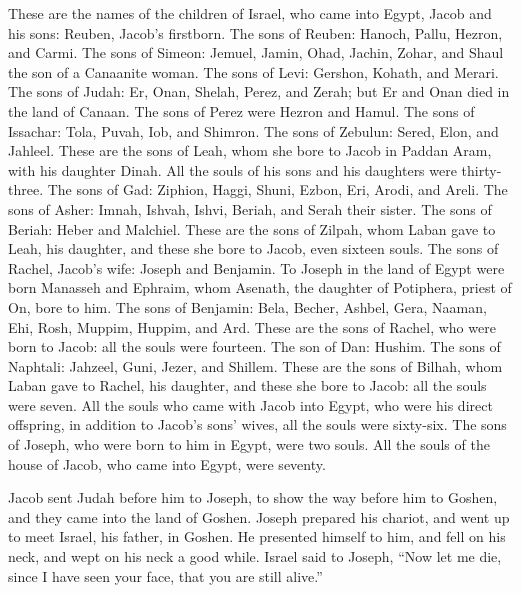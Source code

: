 These are the names of the children of Israel, who came
into Egypt, Jacob and his sons: Reuben, Jacob's firstborn.
 The sons of Reuben: Hanoch, Pallu, Hezron, and Carmi.
 The sons of Simeon: Jemuel, Jamin, Ohad, Jachin, Zohar,
and Shaul the son of a Canaanite woman.  The sons of
Levi: Gershon, Kohath, and Merari.  The sons of Judah:
Er, Onan, Shelah, Perez, and Zerah; but Er and Onan died in the land of
Canaan. The sons of Perez were Hezron and Hamul.  The
sons of Issachar: Tola, Puvah, Iob, and Shimron.  The
sons of Zebulun: Sered, Elon, and Jahleel.  These are the
sons of Leah, whom she bore to Jacob in Paddan Aram, with his daughter
Dinah. All the souls of his sons and his daughters were thirty-three.
 The sons of Gad: Ziphion, Haggi, Shuni, Ezbon, Eri,
Arodi, and Areli.  The sons of Asher: Imnah, Ishvah,
Ishvi, Beriah, and Serah their sister. The sons of Beriah: Heber and
Malchiel.  These are the sons of Zilpah, whom Laban gave
to Leah, his daughter, and these she bore to Jacob, even sixteen souls.
 The sons of Rachel, Jacob's wife: Joseph and Benjamin.
 To Joseph in the land of Egypt were born Manasseh and
Ephraim, whom Asenath, the daughter of Potiphera, priest of On, bore to
him.  The sons of Benjamin: Bela, Becher, Ashbel, Gera,
Naaman, Ehi, Rosh, Muppim, Huppim, and Ard.  These are
the sons of Rachel, who were born to Jacob: all the souls were fourteen.
 The son of Dan: Hushim.  The sons of
Naphtali: Jahzeel, Guni, Jezer, and Shillem.  These are
the sons of Bilhah, whom Laban gave to Rachel, his daughter, and these
she bore to Jacob: all the souls were seven.  All the
souls who came with Jacob into Egypt, who were his direct offspring, in
addition to Jacob's sons' wives, all the souls were sixty-six.
 The sons of Joseph, who were born to him in Egypt, were
two souls. All the souls of the house of Jacob, who came into Egypt,
were seventy.

 Jacob sent Judah before him to Joseph, to show the way
before him to Goshen, and they came into the land of Goshen.
 Joseph prepared his chariot, and went up to meet Israel,
his father, in Goshen. He presented himself to him, and fell on his
neck, and wept on his neck a good while.  Israel said to
Joseph, ``Now let me die, since I have seen your face, that you are
still alive.''

